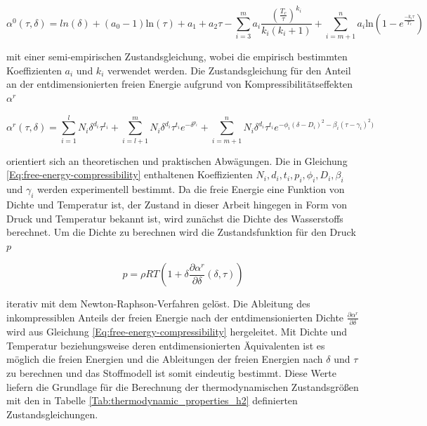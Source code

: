 \begin{equation}\label{Eq:free-energy-idealgas}
	\alpha^0(\tau,\delta)=ln(\delta)+(a_0-1)\mathrm{ln}(\tau)+a_1+a_2\tau-\sum_{i=3}^{m}a_i\frac{(\frac{T_c}{\tau})^{k_i}}{k_i(k_i+1)}+\sum_{i=m+1}^{n}a_i\mathrm{ln}\left(1-e^{\frac{-k_i\tau}{T_c}}\right) \,
\end{equation}

mit einer semi-empirischen Zustandsgleichung, wobei die empirisch bestimmten Koeffizienten $a_i$ und $k_i$ verwendet werden. Die Zustandsgleichung für den Anteil an der entdimensionierten freien Energie aufgrund von Kompressibilitätseffekten $\alpha^r$

\begin{equation}\label{Eq:free-energy-compressibility}
	\alpha^r(\tau,\delta)=\sum_{i=1}^{l}N_i\delta^{d_i}\tau^{t_i}+\sum_{i=l+1}^{m}N_i\delta^{d_i}\tau^{t_i}e^{-\delta^{p_i}}+\sum_{i=m+1}^{n}N_i\delta^{d_i}\tau^{t_i}e^{-\phi_i(\delta-D_i)^2-\beta_i(\tau-\gamma_i)^2)}
\end{equation}

orientiert sich an theoretischen und praktischen Abwägungen. Die in Gleichung \ref{Eq:free-energy-compressibility} enthaltenen Koeffizienten $N_i, d_i, t_i, p_i, \phi_i, D_i, \beta_i$ und $\gamma_i$ werden experimentell bestimmt. Da die freie Energie eine Funktion von Dichte und Temperatur ist, der Zustand in dieser Arbeit hingegen in Form von Druck und Temperatur bekannt ist, wird zunächst die Dichte des Wasserstoffs berechnet. Um die Dichte zu berechnen wird die Zustandsfunktion für den Druck $p$

\begin{equation}\label{Eq:pressure-guess}
	p=\rho RT\left(1+\delta\frac{\partial\alpha^r}{\partial\delta}(\delta, \tau)\right)
\end{equation}

iterativ mit dem Newton-Raphson-Verfahren gelöst. Die Ableitung des inkompressiblen Anteils der freien Energie nach der entdimensionierten Dichte $\frac{\partial\alpha^r}{\partial\delta}$ wird aus Gleichung \ref{Eq:free-energy-compressibility} hergeleitet. Mit Dichte und Temperatur beziehungsweise deren entdimensionierten Äquivalenten ist es möglich die freien Energien und die Ableitungen der freien Energien nach $\delta$ und $\tau$ zu berechnen und das Stoffmodell ist somit eindeutig bestimmt. Diese Werte liefern die Grundlage für die Berechnung der thermodynamischen Zustandsgrößen mit den in Tabelle \ref{Tab:thermodynamic_properties_h2} definierten Zustandsgleichungen.

